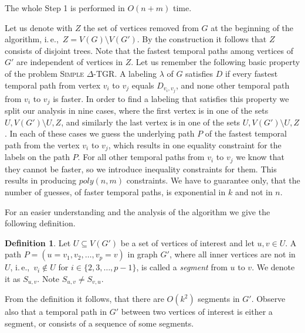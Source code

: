 \documentclass[11pt,a4paper]{article}
\theoremstyle{remark}
\theoremstyle{definition}
\newtheorem{definition}[theorem]{Definition}
\newcommand{\ie}{i.\,e.,\ }
\newcommand{\deltaExact}{\textsc{Simple $\Delta$-TGR}}
\begin{document}
The whole Step 1 is performed in $O(n + m)$ time.


Let us denote with $Z$ the set of vertices removed from $G$ at the beginning of the algorithm, \ie $Z = V(G) \setminus V(G')$.
By the construction it follows that $Z$ consists of disjoint trees. 
Note that the fastest temporal paths among vertices of $G'$ are independent of vertices in $Z$.
Let us remember the following basic property of the problem \deltaExact.
A labeling $\lambda$ of $G$ satisfies $D$ if every fastest temporal path from vertex $v_i$ to $v_j$ equals $D_{v_i, v_j}$,
and none other temporal path from $v_i$ to $v_j$ is faster.
In order to find a labeling that satisfies this property we split our analysis in nine cases,
where the first vertex is in one of the sets $U,V(G') \setminus U, Z$,
and similarly the last vertex is in one of the sets $U,V(G') \setminus U, Z$.
In each of these cases we guess the underlying path $P$ of the fastest temporal path from the vertex $v_i$ to $v_j$, 
which results in one equality constraint for the labels on the path $P$. 
For all other temporal paths from $v_i$ to $v_j$ we know that they cannot be faster, so we introduce inequality constraints for them.
This results in producing $poly(n,m)$ constraints. We have to guarantee only, that the number of guesses, of faster temporal paths, is exponential in $k$ and not in $n$.

For an easier understanding and the analysis of the algorithm we give the following definition.
\begin{definition}
    Let $U \subseteq V(G')$ be a set of vertices of interest and let $u,v \in U$.
    A path $P = (u=v_1,v_2, \dots, v_p = v)$  in graph $G'$, where all inner vertices are not in $U$, \ie $v_i \notin U$ for $i \in \{ 2, 3, \dots, p-1\}$,
    is called a \emph{segment} from $u$ to $v$. We denote it as $S_{u,v}$.
    Note $S_{u,v} \neq S_{v,u}$.
\end{definition}
From the definition it follows, that there are $O(k^2)$ segments in $G'$. 
Observe also that a temporal path in $G'$ between two vertices of interest is either a segment, or consists of a sequence of some segments.
\end{document}
